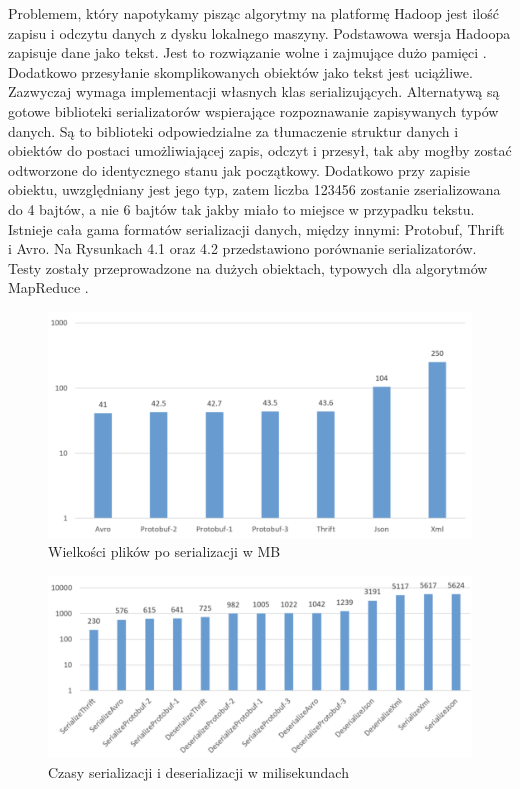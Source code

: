 \documentclass[magisterska]{pracamgr}
\begin{document}
Problemem, który napotykamy pisząc algorytmy na platformę Hadoop jest ilość zapisu i odczytu danych z dysku lokalnego maszyny. Podstawowa wersja Hadoopa zapisuje dane jako tekst. Jest to rozwiązanie wolne i zajmujące dużo pamięci \cite{shvachko2010hadoop, white2012hadoop}. Dodatkowo przesyłanie skomplikowanych obiektów jako tekst jest uciążliwe. Zazwyczaj wymaga implementacji własnych klas serializujących. Alternatywą są gotowe biblioteki serializatorów wspierające rozpoznawanie zapisywanych typów danych. Są to biblioteki odpowiedzialne za tłumaczenie struktur danych i obiektów do postaci umożliwiającej zapis, odczyt i przesył, tak aby mogłby zostać odtworzone do identycznego stanu jak początkowy. Dodatkowo przy zapisie obiektu, uwzględniany jest jego typ, zatem liczba 123456 zostanie zserializowana do 4 bajtów, a nie 6 bajtów tak jakby miało to miejsce w przypadku tekstu. Istnieje cała gama formatów serializacji danych, między innymi: Protobuf, Thrift i Avro. Na Rysunkach 4.1 oraz 4.2 przedstawiono porównanie serializatorów. Testy zostały przeprowadzone na dużych obiektach, typowych dla algorytmów MapReduce \cite{avro, serialization}.

\begin{figure}[H]
    \caption{Wielkości plików po serializacji w MB}
    \includegraphics[width=15cm]{serialization_compression.png}
\end{figure}
\begin{figure}[H]
    \caption{Czasy serializacji i deserializacji w milisekundach}
    \includegraphics[width=15cm]{serialization_time.png}
\end{figure}
\end{document}
